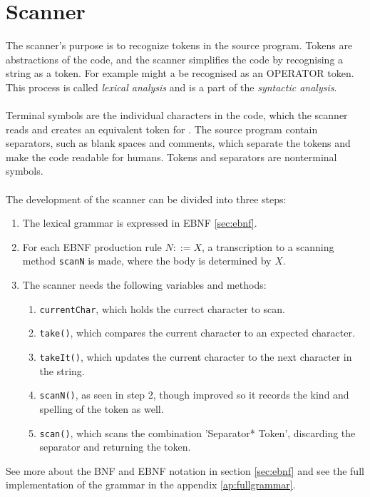 \section{Scanner}
\label{sec:scannertheory}
The scanner's purpose is to recognize tokens in the source program. Tokens are abstractions of the code, and the scanner simplifies the code by recognising a string as a token. For example might a \+ be recognised as an OPERATOR token. This process is called \textit{lexical analysis} and is a part of the \textit{syntactic analysis}.
\\
\\
Terminal symbols are the individual characters in the code, which the scanner reads and creates an equivalent token for \cite{misc:spo}. The source program contain separators, such as blank spaces and comments, which separate the tokens and make the code readable for humans. Tokens and separators are nonterminal symbols.
\\
\\
The development of the scanner can be divided into three steps:
\begin{enumerate}
\item The lexical grammar is expressed in EBNF \ref{sec:ebnf}.
\item For each EBNF production rule $N::=X$, a transcription to a scanning method \texttt{scanN} is made, where the body is determined by $X$.
\item The scanner needs the following variables and methods: 
\begin{enumerate}
\item \texttt{currentChar}, which holds the currect character to scan.
\item \texttt{take()}, which compares the current character to an expected character.
\item \texttt{takeIt()}, which updates the current character to the next character in the string.
\item \texttt{scanN()}, as seen in step 2, though improved so it records the kind and spelling of the token as well.
\item \texttt{scan()}, which scans the combination 'Separator* Token', discarding the separator and returning the token.
\end{enumerate}
\end{enumerate}

See more about the BNF and EBNF notation in section \ref{sec:ebnf} and see the full implementation of the grammar in the appendix \ref{ap:fullgrammar}.